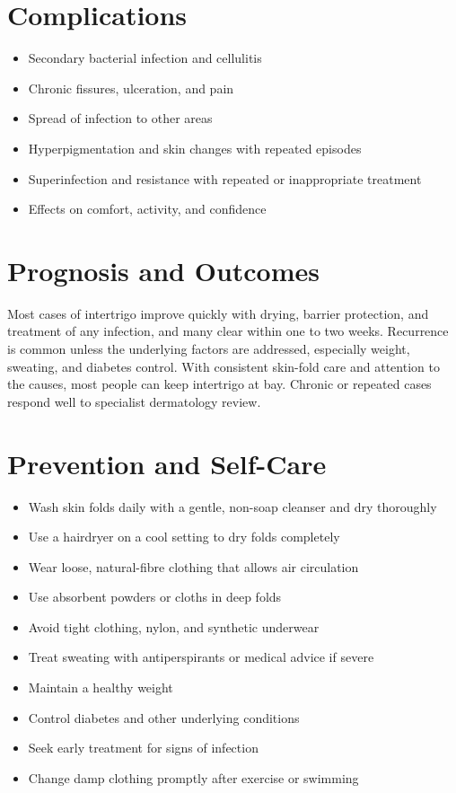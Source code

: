 \section*{Complications}
\begin{itemize}
    \item Secondary bacterial infection and cellulitis
    \item Chronic fissures, ulceration, and pain
    \item Spread of infection to other areas
    \item Hyperpigmentation and skin changes with repeated episodes
    \item Superinfection and resistance with repeated or inappropriate treatment
    \item Effects on comfort, activity, and confidence
\end{itemize}

\section*{Prognosis and Outcomes}
Most cases of intertrigo improve quickly with drying, barrier protection, and treatment of any infection, and many clear within one to two weeks. Recurrence is common unless the underlying factors are addressed, especially weight, sweating, and diabetes control. With consistent skin-fold care and attention to the causes, most people can keep intertrigo at bay. Chronic or repeated cases respond well to specialist dermatology review.

\section*{Prevention and Self-Care}
\begin{itemize}
    \item Wash skin folds daily with a gentle, non-soap cleanser and dry thoroughly
    \item Use a hairdryer on a cool setting to dry folds completely
    \item Wear loose, natural-fibre clothing that allows air circulation
    \item Use absorbent powders or cloths in deep folds
    \item Avoid tight clothing, nylon, and synthetic underwear
    \item Treat sweating with antiperspirants or medical advice if severe
    \item Maintain a healthy weight
    \item Control diabetes and other underlying conditions
    \item Seek early treatment for signs of infection
    \item Change damp clothing promptly after exercise or swimming
\end{itemize}

